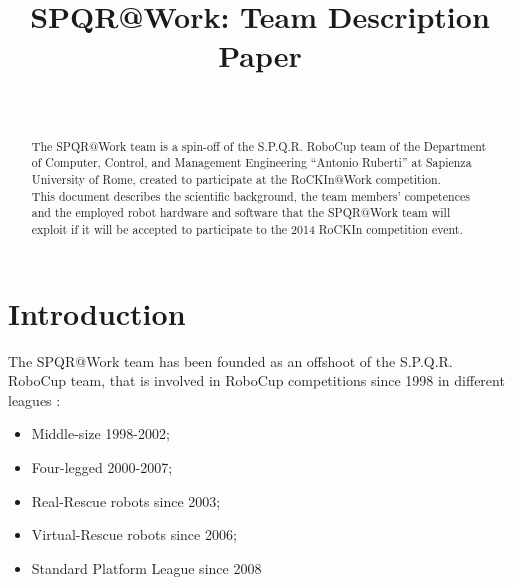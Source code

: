 \documentclass[conference]{IEEEtran}
\begin{document}
%
\title{SPQR@Work: Team Description Paper}

\author{\\
}

\maketitle


\begin{abstract}
The SPQR@Work team is a spin-off of the S.P.Q.R. RoboCup team of the Department of Computer, Control, and Management Engineering “Antonio Ruberti” at Sapienza University of Rome, created to participate at the RoCKIn@Work competition.\\
This document describes the scientific background, the team members' competences and the employed robot hardware and software that the SPQR@Work team will exploit if it will be accepted to participate to the 2014 RoCKIn competition event.
\end{abstract}

\section{Introduction}
The SPQR@Work team has been founded as an offshoot of the S.P.Q.R. RoboCup team, that is involved in RoboCup competitions since 1998 in different leagues :
\begin{itemize}
\item Middle-size 1998-2002;
\item Four-legged 2000-2007;
\item Real-Rescue robots since 2003;
\item Virtual-Rescue robots since 2006;
\item Standard Platform League since 2008
 \end{itemize}
\end{document}
